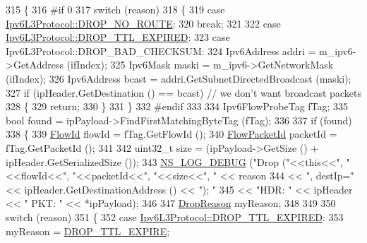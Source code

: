\begin{DoxyCode}
315 \{
316 \textcolor{preprocessor}{#if 0}
317   \textcolor{keywordflow}{switch} (reason)
318     \{
319     \textcolor{keywordflow}{case} \hyperlink{classns3_1_1Ipv6L3Protocol_a33c64db9bc35f71ff368b132bfffa37aa97de4f69c19b2f94b684448beee892f4}{Ipv6L3Protocol::DROP\_NO\_ROUTE}:
320       \textcolor{keywordflow}{break};
321 
322     \textcolor{keywordflow}{case} \hyperlink{classns3_1_1Ipv6L3Protocol_a33c64db9bc35f71ff368b132bfffa37aa49c4e7173190b1bbba7d6300b06a16ed}{Ipv6L3Protocol::DROP\_TTL\_EXPIRED}:
323     \textcolor{keywordflow}{case} Ipv6L3Protocol::DROP\_BAD\_CHECKSUM:
324       Ipv6Address addri = m\_ipv6->GetAddress (ifIndex);
325       Ipv6Mask maski = m\_ipv6->GetNetworkMask (ifIndex);
326       Ipv6Address bcast = addri.GetSubnetDirectedBroadcast (maski);
327       \textcolor{keywordflow}{if} (ipHeader.GetDestination () == bcast) \textcolor{comment}{// we don't want broadcast packets}
328         \{
329           \textcolor{keywordflow}{return};
330         \}
331     \}
332 \textcolor{preprocessor}{#endif}
333 
334   Ipv6FlowProbeTag fTag;
335   \textcolor{keywordtype}{bool} found = ipPayload->FindFirstMatchingByteTag (fTag);
336 
337   \textcolor{keywordflow}{if} (found)
338     \{
339       \hyperlink{group__flow-monitor_ga39a766c4a370cdb9ab8ac85da4b288e9}{FlowId} flowId = fTag.GetFlowId ();
340       \hyperlink{group__flow-monitor_gaa1cb18250e1672975204f1254b8aa2ae}{FlowPacketId} packetId = fTag.GetPacketId ();
341 
342       uint32\_t size = (ipPayload->GetSize () + ipHeader.GetSerializedSize ());
343       \hyperlink{group__logging_ga413f1886406d49f59a6a0a89b77b4d0a}{NS\_LOG\_DEBUG} (\textcolor{stringliteral}{"Drop ("}<<\textcolor{keyword}{this}<<\textcolor{stringliteral}{", "}<<flowId<<\textcolor{stringliteral}{", "}<<packetId<<\textcolor{stringliteral}{", "}<<size<<\textcolor{stringliteral}{", "} << reason 
344                             << \textcolor{stringliteral}{", destIp="} << ipHeader.GetDestinationAddress () << \textcolor{stringliteral}{"); "}
345                             << \textcolor{stringliteral}{"HDR: "} << ipHeader << \textcolor{stringliteral}{" PKT: "} << *ipPayload);
346 
347       \hyperlink{classns3_1_1Ipv6FlowProbe_ac81e6b10f93e4d47d440d1df59b1e6b1}{DropReason} myReason;
348 
349 
350       \textcolor{keywordflow}{switch} (reason)
351         \{
352         \textcolor{keywordflow}{case} \hyperlink{classns3_1_1Ipv6L3Protocol_a33c64db9bc35f71ff368b132bfffa37aa49c4e7173190b1bbba7d6300b06a16ed}{Ipv6L3Protocol::DROP\_TTL\_EXPIRED}:
353           myReason = \hyperlink{classns3_1_1Ipv6FlowProbe_ac81e6b10f93e4d47d440d1df59b1e6b1a001e42aac735973c976f9a8fb400eb37}{DROP\_TTL\_EXPIRE};

\end{DoxyCode}
